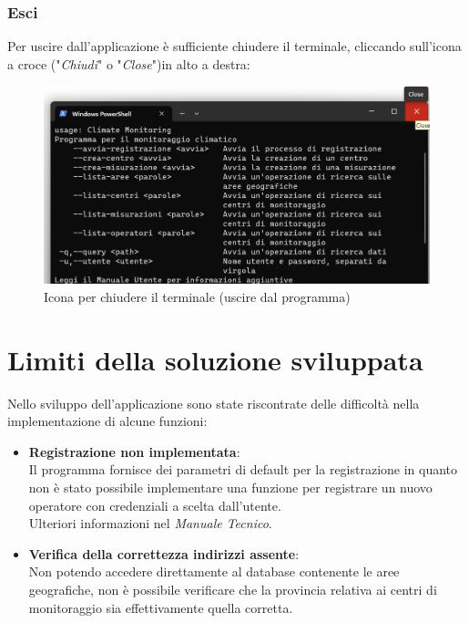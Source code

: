 \documentclass[12pt]{scrreprt}
\begin{document}
	\subsection{Esci}
	Per uscire dall’applicazione \`e sufficiente chiudere il terminale, cliccando sull’icona a croce ("\textsl{Chiudi}" o "\textsl{Close}")in alto a destra:
	\begin{figure}[H]
		\centering
		\includegraphics[width=0.9\linewidth]{Screen/esci}
		\caption{Icona per chiudere il terminale (uscire dal programma)}
		\label{fig:esci}
	\end{figure}

	\chapter{Limiti della soluzione sviluppata}
	Nello sviluppo dell'applicazione sono state riscontrate delle difficolt\`a nella implementazione di alcune funzioni:
	\begin{itemize}
		\item \textbf{Registrazione non implementata}:\\Il programma fornisce dei parametri di default per la registrazione in quanto non \`e stato possibile implementare una funzione per registrare un nuovo operatore con credenziali a scelta dall'utente.\\Ulteriori informazioni nel \textsl{Manuale Tecnico}.
		
		\item \textbf{Verifica della correttezza indirizzi assente}:\\Non potendo accedere direttamente al database contenente le aree geografiche, non \`e possibile verificare che la provincia relativa ai centri di monitoraggio sia effettivamente quella corretta.
	\end{itemize}

	
	

	\nocite{IuriTex}
	
	
	\printindex
\end{document}
